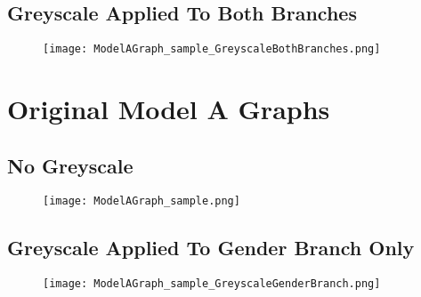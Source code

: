 \subsection*{Greyscale Applied To Both Branches}
\begin{figure}[h!]
    \centering
    \texttt{[image: ModelAGraph\_sample\_GreyscaleBothBranches.png]}
    \label{fig:modelA_original_graph_gs_both}
\end{figure}
\newpage

\section*{Original Model A Graphs}
\subsection*{No Greyscale}
\begin{figure}[h!]
    \centering
    \texttt{[image: ModelAGraph\_sample.png]}
    \label{fig:modelA_original_graph_gs_neither}
\end{figure}
\newpage

\subsection*{Greyscale Applied To Gender Branch Only}
\begin{figure}[h!]
    \centering
    \texttt{[image: ModelAGraph\_sample\_GreyscaleGenderBranch.png]}
    \label{fig:modelA_original_graph_gs_gender}
\end{figure}
\newpage
